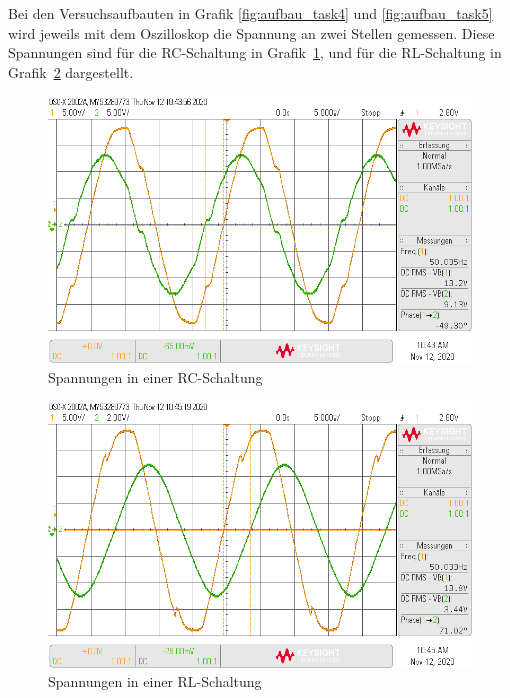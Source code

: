 \documentclass{article}
\begin{document}
Bei den Versuchsaufbauten in Grafik \ref{fig:aufbau_task4} und \ref{fig:aufbau_task5} wird jeweils mit dem Oszilloskop die Spannung an zwei Stellen gemessen. Diese Spannungen sind für die RC-Schaltung in Grafik~\ref{fig:task4_kurve}, und für die RL-Schaltung in Grafik~\ref{fig:task5_kurve} dargestellt.



\begin{figure}[H]
\centering
\caption{Spannungen in einer RC-Schaltung}
\label{fig:task4_kurve}
\includegraphics[scale=0.4]{daten/pul_6.png}
\end{figure}
 



\begin{figure}[H]
\centering
\caption{Spannungen in einer RL-Schaltung}
\label{fig:task5_kurve}
\includegraphics[scale=0.4]{daten/pul_7.png}
\end{figure}
 
\end{document}
